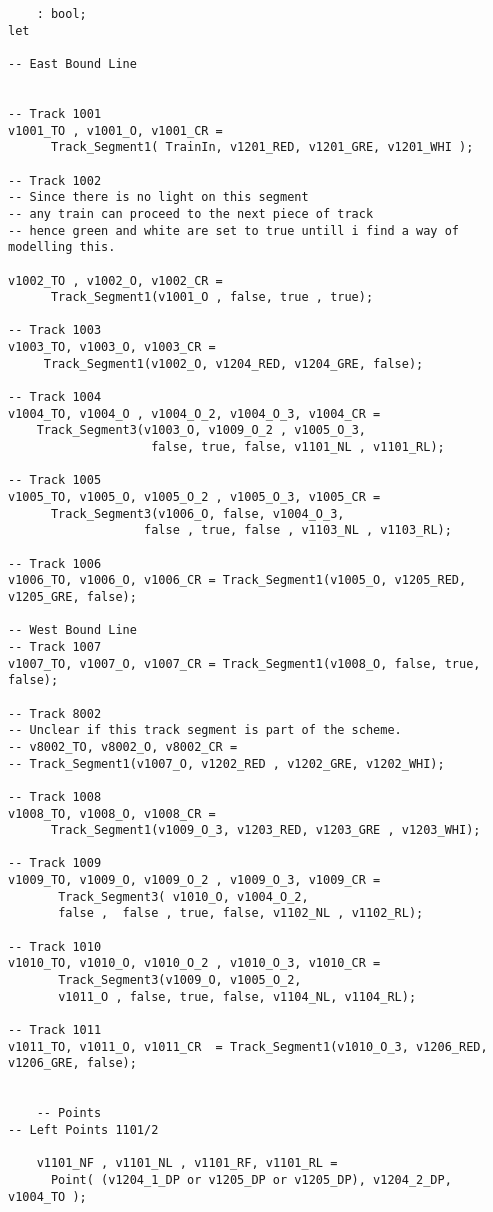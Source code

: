 \begin{verbatim}
	: bool;
let

-- East Bound Line


-- Track 1001 
v1001_TO , v1001_O, v1001_CR = 
      Track_Segment1( TrainIn, v1201_RED, v1201_GRE, v1201_WHI );  

-- Track 1002
-- Since there is no light on this segment
-- any train can proceed to the next piece of track
-- hence green and white are set to true untill i find a way of modelling this.

v1002_TO , v1002_O, v1002_CR =
      Track_Segment1(v1001_O , false, true , true);

-- Track 1003
v1003_TO, v1003_O, v1003_CR	=
     Track_Segment1(v1002_O, v1204_RED, v1204_GRE, false);
	
-- Track 1004
v1004_TO, v1004_O , v1004_O_2, v1004_O_3, v1004_CR =
 	Track_Segment3(v1003_O, v1009_O_2 , v1005_O_3,
                    false, true, false, v1101_NL , v1101_RL);
	
-- Track 1005
v1005_TO, v1005_O, v1005_O_2 , v1005_O_3, v1005_CR = 
      Track_Segment3(v1006_O, false, v1004_O_3,
                   false , true, false , v1103_NL , v1103_RL);

-- Track 1006
v1006_TO, v1006_O, v1006_CR = Track_Segment1(v1005_O, v1205_RED, v1205_GRE, false);

-- West Bound Line
-- Track 1007
v1007_TO, v1007_O, v1007_CR = Track_Segment1(v1008_O, false, true, false);
	
-- Track 8002
-- Unclear if this track segment is part of the scheme.
-- v8002_TO, v8002_O, v8002_CR = 
-- Track_Segment1(v1007_O, v1202_RED , v1202_GRE, v1202_WHI);
	
-- Track 1008
v1008_TO, v1008_O, v1008_CR	=
      Track_Segment1(v1009_O_3, v1203_RED, v1203_GRE , v1203_WHI);
	
-- Track 1009
v1009_TO, v1009_O, v1009_O_2 , v1009_O_3, v1009_CR =
       Track_Segment3( v1010_O, v1004_O_2, 
       false ,  false , true, false, v1102_NL , v1102_RL);
	
-- Track 1010
v1010_TO, v1010_O, v1010_O_2 , v1010_O_3, v1010_CR =
       Track_Segment3(v1009_O, v1005_O_2,
       v1011_O , false, true, false, v1104_NL, v1104_RL);
	
-- Track 1011
v1011_TO, v1011_O, v1011_CR	 = Track_Segment1(v1010_O_3, v1206_RED, v1206_GRE, false);
	
	
	-- Points
-- Left Points 1101/2
	
	v1101_NF , v1101_NL , v1101_RF, v1101_RL =	
      Point( (v1204_1_DP or v1205_DP or v1205_DP), v1204_2_DP, v1004_TO );
	

\end{verbatim}
